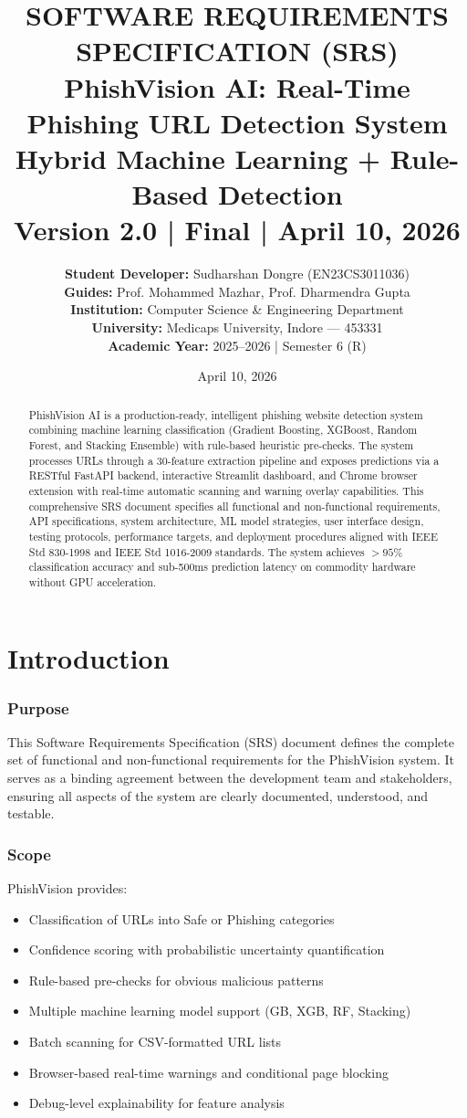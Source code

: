 \documentclass[12pt,a4paper]{report}
\title{%
\Huge\textbf{SOFTWARE REQUIREMENTS SPECIFICATION (SRS)}\\[0.5cm]
{\Large PhishVision AI: Real-Time Phishing URL Detection System}\\[0.3cm]
{\normalsize Hybrid Machine Learning + Rule-Based Detection}\\[0.3cm]
{\small Version 2.0 | Final | April 10, 2026}
}
\author{%
\textbf{Student Developer:} Sudharshan Dongre (EN23CS3011036)\\
\textbf{Guides:} Prof. Mohammed Mazhar, Prof. Dharmendra Gupta\\
\textbf{Institution:} Computer Science \& Engineering Department\\
\textbf{University:} Medicaps University, Indore --- 453331\\
\textbf{Academic Year:} 2025--2026 | Semester 6 (R)
}
\date{April 10, 2026}
\begin{document}
\maketitle

\begin{abstract}
PhishVision AI is a production-ready, intelligent phishing website detection system combining 
machine learning classification (Gradient Boosting, XGBoost, Random Forest, and Stacking Ensemble) 
with rule-based heuristic pre-checks. The system processes URLs through a 30-feature extraction 
pipeline and exposes predictions via a RESTful FastAPI backend, interactive Streamlit dashboard, 
and Chrome browser extension with real-time automatic scanning and warning overlay capabilities. 
This comprehensive SRS document specifies all functional and non-functional requirements, API 
specifications, system architecture, ML model strategies, user interface design, testing protocols, 
performance targets, and deployment procedures aligned with IEEE Std 830-1998 and IEEE Std 1016-2009 
standards. The system achieves $>95\%$ classification accuracy and sub-500ms prediction latency 
on commodity hardware without GPU acceleration.
\end{abstract}

\clearpage
\tableofcontents
\clearpage

\chapter{Introduction}

\subsection{Purpose}
This Software Requirements Specification (SRS) document defines the complete set of 
functional and non-functional requirements for the PhishVision system. It serves as 
a binding agreement between the development team and stakeholders, ensuring all aspects 
of the system are clearly documented, understood, and testable.

\subsection{Scope}
PhishVision provides:
\begin{itemize}[leftmargin=*]
    \item Classification of URLs into Safe or Phishing categories
    \item Confidence scoring with probabilistic uncertainty quantification
    \item Rule-based pre-checks for obvious malicious patterns
    \item Multiple machine learning model support (GB, XGB, RF, Stacking)
    \item Batch scanning for CSV-formatted URL lists
    \item Browser-based real-time warnings and conditional page blocking
    \item Debug-level explainability for feature analysis
\end{itemize}
\end{document}
